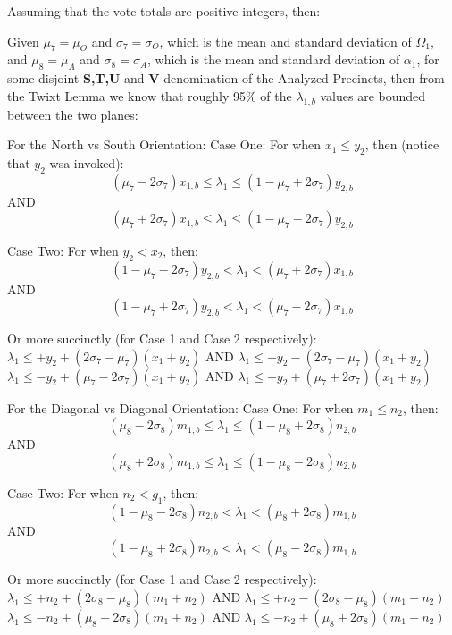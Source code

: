 \newpage
\begin{corollary}
Assuming that the vote totals are positive integers, then:

Given $\mu_{7}=\mu_{O}$ and $\sigma_{7}=\sigma_{O}$, which is the mean and standard deviation of $\Omega_{1}$, and $\mu_{8}=\mu_{A}$ and $\sigma_{8}=\sigma_{A}$, which is the mean and standard deviation of $\alpha_{1}$, for some disjoint \textbf{S,T,U} and \textbf{V} denomination of the Analyzed Precincts, then from the Twixt Lemma we know that roughly 95\% of the $\lambda_{1,b}$ values are bounded between the two planes:

For the North vs South Orientation:
Case One:  For when $x_{1} \le y_{2}$, then (notice that $y_{2}$ wsa invoked):
$$(\mu_{7}-2\sigma_{7})x_{1,b} \le \lambda_{1} \le (1-\mu_{7}+2\sigma_{7})y_{2,b}$$
AND
$$(\mu_{7}+2\sigma_{7})x_{1,b} \le \lambda_{1} \le (1-\mu_{7}-2\sigma_{7})y_{2,b}$$

Case Two: For when $y_{2} < x_{2}$, then:
$$(1-\mu_{7}-2\sigma_{7})y_{2,b} < \lambda_{1} < (\mu_{7}+2\sigma_{7})x_{1,b}$$
AND
$$(1-\mu_{7}+2\sigma_{7})y_{2,b} < \lambda_{1} < (\mu_{7}-2\sigma_{7})x_{1,b}$$

Or more succinctly (for Case 1 and Case 2 respectively):\\
$\lambda_{1} \le +y_{2}+(2\sigma_{7}-\mu_{7})(x_{1}+y_{2})$ AND $\lambda_{1} \le +y_{2}-(2\sigma_{7}-\mu_{7})(x_{1}+y_{2})$\\
$\lambda_{1} \le -y_{2}+(\mu_{7}-2\sigma_{7})(x_{1}+y_{2})$ AND $\lambda_{1} \le -y_{2}+(\mu_{7}+2\sigma_{7})(x_{1}+y_{2})$

For the Diagonal vs Diagonal Orientation:
Case One:  For when $m_{1} \le n_{2}$, then:
$$(\mu_{8}-2\sigma_{8})m_{1,b} \le \lambda_{1} \le (1-\mu_{8}+2\sigma_{8})n_{2,b}$$
AND
$$(\mu_{8}+2\sigma_{8})m_{1,b} \le \lambda_{1} \le (1-\mu_{8}-2\sigma_{8})n_{2,b}$$

Case Two: For when $n_{2} < g_{1}$, then:
$$(1-\mu_{8}-2\sigma_{8})n_{2,b} < \lambda_{1} < (\mu_{8}+2\sigma_{8})m_{1,b}$$
AND
$$(1-\mu_{8}+2\sigma_{8})n_{2,b} < \lambda_{1} < (\mu_{8}-2\sigma_{8})m_{1,b}$$

Or more succinctly (for Case 1 and Case 2 respectively):\\
$\lambda_{1} \le +n_{2}+(2\sigma_{8}-\mu_{8})(m_{1}+n_{2})$ AND $\lambda_{1} \le +n_{2}-(2\sigma_{8}-\mu_{8})(m_{1}+n_{2})$\\
$\lambda_{1} \le -n_{2}+(\mu_{8}-2\sigma_{8})(m_{1}+n_{2})$ AND $\lambda_{1} \le -n_{2}+(\mu_{8}+2\sigma_{8})(m_{1}+n_{2})$
\end{corollary}
